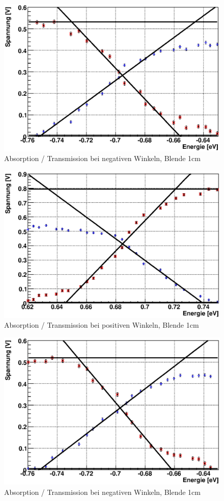 \documentclass[12pt]{article}
\begin{document}
\begin{figure}[H]  
\centering
\includegraphics[width=0.9\linewidth]{pictures/bandluecke/grgeb1b.eps}
\caption{Absorption / Transmission bei negativen Winkeln, Blende 1cm}
\end{figure}

\begin{figure}[H]  
\centering
\includegraphics[width=0.9\linewidth]{pictures/bandluecke/grgeb2.eps}
\caption{Absorption / Transmission bei positiven Winkeln, Blende 1cm}
\end{figure}

\begin{figure}[H]  
\centering
\includegraphics[width=0.9\linewidth]{pictures/bandluecke/grgeb2b.eps}
\caption{Absorption / Transmission bei negativen Winkeln, Blende 1cm}
\end{figure}
\end{document}
